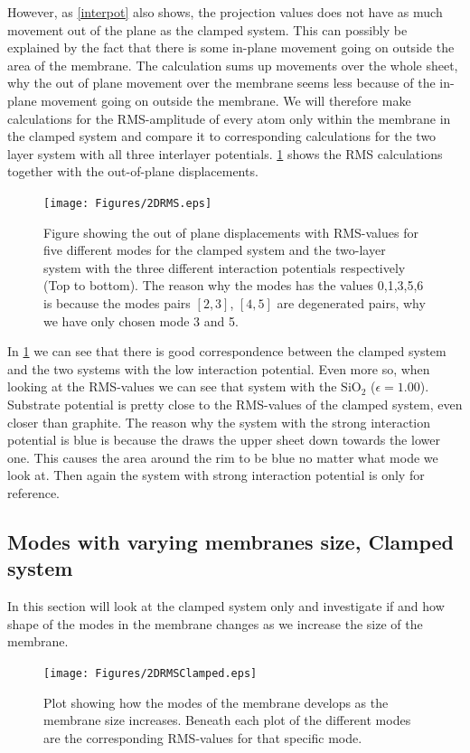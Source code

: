 However, as \cref{interpot} also shows, the projection values does not have as much movement out of the plane as the clamped system. This can possibly be explained by the fact that there is some in-plane movement going on outside the area of the membrane. The calculation sums up movements over the whole sheet, why the out of plane movement over the membrane seems less because of the in-plane movement going on outside the membrane. We will therefore make calculations for the RMS-amplitude of every atom only within the membrane in the clamped system and compare it to corresponding calculations for the two layer system with all three interlayer potentials. \cref{2DRMS} shows the RMS calculations together with the out-of-plane displacements.
\onecolumngrid

\begin{figure}[H]
    \centering
    \texttt{[image: Figures/2DRMS.eps]}
    \caption{Figure showing the out of plane displacements with RMS-values for five different modes for the clamped system and the two-layer system with the three different interaction potentials respectively (Top to bottom). The reason why the modes has the values 0,1,3,5,6 is because the modes pairs $[2,3]$, $[4,5]$ are degenerated pairs, why we have only chosen mode 3 and 5.}
    \label{2DRMS}
\end{figure}
\twocolumngrid

In \cref{2DRMS} we can see that there is good correspondence between the clamped system and the two systems with the low interaction potential. Even more so, when looking at the RMS-values we can see that system with the $\text{SiO}_{2}$ ($\epsilon=1.00$). Substrate potential is pretty close to the RMS-values of the clamped system, even closer than graphite. The reason why the system with the strong interaction potential is blue is because the draws the upper sheet down towards the lower one. This causes the area around the rim to be blue no matter what mode we look at. Then again the system with strong interaction potential is only for reference.
\subsection{Modes with varying membranes size, Clamped system}In this section will look at the clamped system only and investigate if and how shape of the modes in the membrane changes as we increase the size of the membrane.
\onecolumngrid

 \begin{figure}[H]
     \centering
     \texttt{[image: Figures/2DRMSClamped.eps]}
     \caption{Plot showing how the modes of the membrane develops as the membrane size increases. Beneath each plot of the different modes are the corresponding RMS-values for that specific mode.
     }
     \label{BIG}
 \end{figure}
\twocolumngrid

